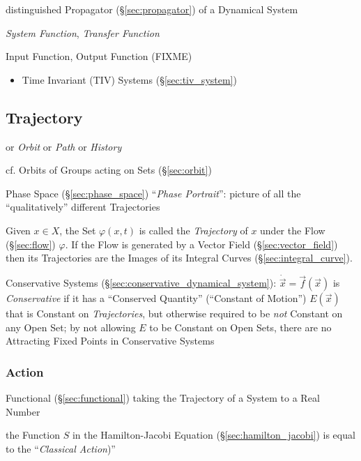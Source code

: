 distinguished Propagator (\S\ref{sec:propagator}) of a Dynamical System

\emph{System Function}, \emph{Transfer Function}

\fist Input Function, Output Function (FIXME)

\begin{itemize}
  \item Time Invariant (TIV) Systems (\S\ref{sec:tiv_system})
\end{itemize}



\subsection{Trajectory}\label{sec:trajectory}

or \emph{Orbit} or \emph{Path} or \emph{History}

\fist cf. Orbits of Groups acting on Sets (\S\ref{sec:orbit})

Phase Space (\S\ref{sec:phase_space}) ``\emph{Phase Portrait}'': picture of all
the ``qualitatively'' different Trajectories

Given $x \in X$, the Set $\varphi(x,t)$ is called the \emph{Trajectory} of $x$
under the Flow (\S\ref{sec:flow}) $\varphi$. If the Flow is generated by a
Vector Field (\S\ref{sec:vector_field}) then its Trajectories are the Images of
its Integral Curves (\S\ref{sec:integral_curve}).

Conservative Systems (\S\ref{sec:conservative_dynamical_system}):
$\dot{\vec{x}} = \vec{f}(\vec{x})$ is \emph{Conservative} if it has a
``Conserved Quantity'' (``Constant of Motion'') $E(\vec{x})$ that is Constant
on \emph{Trajectories}, but otherwise required to be \emph{not} Constant on any
Open Set;
by not allowing $E$ to be Constant on Open Sets, there are no Attracting Fixed
Points in Conservative Systems



\subsubsection{Action}\label{sec:trajectory_action}

Functional (\S\ref{sec:functional}) taking the Trajectory of a System to a Real
Number

the Function $S$ in the Hamilton-Jacobi Equation (\S\ref{sec:hamilton_jacobi})
is equal to the ``\emph{Classical Action})''



